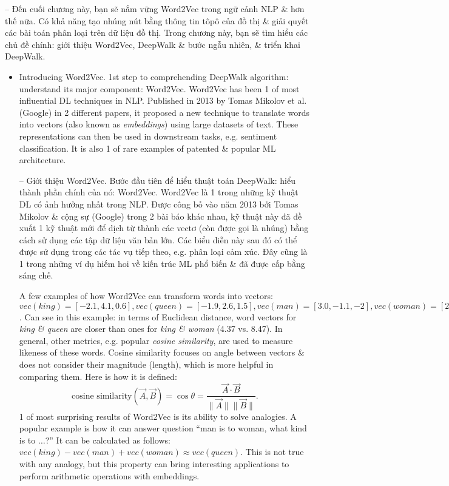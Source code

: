 \documentclass{article}
\begin{document}
\begin{itemize}
    -- Đến cuối chương này, bạn sẽ nắm vững Word2Vec trong ngữ cảnh NLP \& hơn thế nữa. Có khả năng tạo nhúng nút bằng thông tin tôpô của đồ thị \& giải quyết các bài toán phân loại trên dữ liệu đồ thị. Trong chương này, bạn sẽ tìm hiểu các chủ đề chính: giới thiệu Word2Vec, DeepWalk \& bước ngẫu nhiên, \& triển khai DeepWalk.
    \begin{itemize}
        \item {\sf Introducing Word2Vec.} 1st step to comprehending DeepWalk algorithm: understand its major component: Word2Vec. Word2Vec has been 1 of most influential DL techniques in NLP. Published in 2013 by {\sc Tomas Mikolov} et al. (Google) in 2 different papers, it proposed a new technique to translate words into vectors (also known as {\it embeddings}) using large datasets of text. These representations can then be used in downstream tasks, e.g. sentiment classification. It is also 1 of rare examples of patented \& popular ML architecture.

        -- {\sf Giới thiệu Word2Vec.} Bước đầu tiên để hiểu thuật toán DeepWalk: hiểu thành phần chính của nó: Word2Vec. Word2Vec là 1 trong những kỹ thuật DL có ảnh hưởng nhất trong NLP. Được công bố vào năm 2013 bởi {\sc Tomas Mikolov} \& cộng sự (Google) trong 2 bài báo khác nhau, kỹ thuật này đã đề xuất 1 kỹ thuật mới để dịch từ thành các vectơ (còn được gọi là {\sc nhúng}) bằng cách sử dụng các tập dữ liệu văn bản lớn. Các biểu diễn này sau đó có thể được sử dụng trong các tác vụ tiếp theo, e.g. phân loại cảm xúc. Đây cũng là 1 trong những ví dụ hiếm hoi về kiến trúc ML phổ biến \& đã được cấp bằng sáng chế.

        A few examples of how Word2Vec can transform words into vectors: $vec(king) = [-2.1,4.1,0.6],vec(queen) = [-1.9,2.6,1.5],vec(man) = [3.0,-1.1,-2],vec(woman) = [2.8,-2.6,-1.1]$. Can see in this example: in terms of Euclidean distance, word vectors for {\it king \& queen} are closer than ones for {\it king \& woman} (4.37 vs. 8.47). In general, other metrics, e.g. popular {\it cosine similarity}, are used to measure likeness of these words. Cosine similarity focuses on angle between vectors \& does not consider their magnitude (length), which is more helpful in comparing them. Here is how it is defined:
        \begin{equation*}
            \mbox{cosine similarity}(\vec{A},\vec{B}) = \cos\theta = \frac{\vec{A}\cdot\vec{B}}{\|\vec{A}\|\|\vec{B}\|}.
        \end{equation*}
        1 of most surprising results of Word2Vec is its ability to solve analogies. A popular example is how it can answer question ``man is to woman, what kind is to $\ldots$?'' It can be calculated as follows: $vec(king) - vec(man) + vec(woman)\approx vec(queen)$. This is not true with any analogy, but this property can bring interesting applications to perform arithmetic operations with embeddings.


\end{itemize}
\end{itemize}
\end{document}
